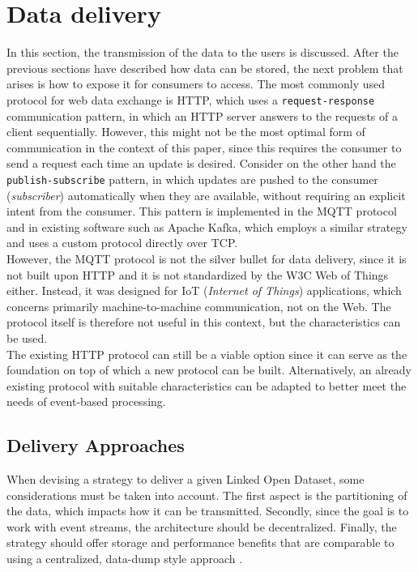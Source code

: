 \section{Data delivery}\label{sec:delivery}
In this section, the transmission of the data to the users is discussed. After the previous sections have described how data can be stored, the next problem that arises is how to expose it for consumers to access. The most commonly used protocol for web data exchange is HTTP, which uses a \texttt{request-response} communication pattern, in which an HTTP server answers to the requests of a client sequentially. However, this might not be the most optimal form of communication in the context of this paper, since this requires the consumer to send a request each time an update is desired. Consider on the other hand the \texttt{publish-subscribe} pattern, in which updates are pushed to the consumer (\emph{subscriber}) automatically when they are available, without requiring an explicit intent from the consumer. This pattern is implemented in the MQTT protocol and in existing software such as Apache Kafka, which employs a similar strategy and uses a custom protocol directly over TCP.\\

\noindent However, the MQTT protocol is not the silver bullet for data delivery, since it is not built upon HTTP and it is not standardized by the W3C Web of Things either. Instead, it was designed for IoT (\emph{Internet of Things}) applications, which concerns primarily machine-to-machine communication, not on the Web. The protocol itself is therefore not useful in this context, but the characteristics can be used.\\

\noindent The existing HTTP protocol can still be a viable option since it can serve as the foundation on top of which a new protocol can be built. Alternatively, an already existing protocol with suitable characteristics can be adapted to better meet the needs of event-based processing.

\subsection{Delivery Approaches}
When devising a strategy to deliver a given Linked Open Dataset, some considerations must be taken into account. The first aspect is the partitioning of the data, which impacts how it can be transmitted. Secondly, since the goal is to work with event streams, the architecture should be decentralized. Finally, the strategy should offer storage and performance benefits that are comparable to using a centralized, data-dump style approach \cite{delva2020geospatial}.\\

